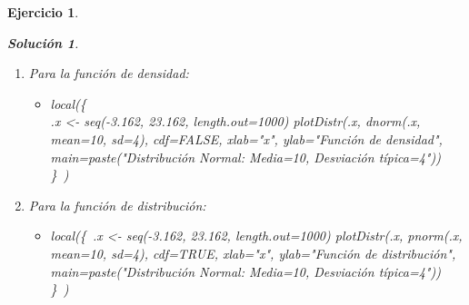 \documentclass[11pt, a4paper]{article}
\newif\IfInSansMode
\theoremstyle{theorem-style}
\theoremstyle{definition-style}
\newtheorem{ejer}{Ejercicio}[section]
\theoremstyle{remark-style}
\newtheorem*{sol}{Solución}
\theoremstyle{example-style}
\begin{document}
\begin{ejer}
\begin{sol}
\begin{enumerate}
	\item Para la función de densidad:
		\begin{itemize}
			\item local(\{\ \\
				.x <- seq(-3.162, 23.162, length.out=1000)  
				plotDistr(.x, dnorm(.x, mean=10, sd=4), cdf=FALSE, xlab="x", ylab="Función de densidad", 
				main=paste("Distribución Normal:  Media=10, Desviación típica=4")) \\
			\}\ )
		\end{itemize}
	\item Para la función de distribución:
		\begin{itemize}
			\item local(\{\
				.x <- seq(-3.162, 23.162, length.out=1000)  
				plotDistr(.x, pnorm(.x, mean=10, sd=4), cdf=TRUE, xlab="x", ylab="Función de distribución", 
				main=paste("Distribución Normal:  Media=10, Desviación típica=4")) \\
			\}\ )
		\end{itemize}
\end{enumerate}
 
	
	
	
	
	
	
	

\end{sol}








\end{ejer}

\end{document}
